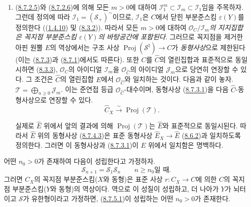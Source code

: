 \begin{remark}[8.7.4]
\begin{enumerate}
  \item[\rm{(ii)}] (\hyperref[II.8.7.2.5-ko]{8.7.2.5})와
  (\hyperref[II.8.7.2.6-ko]{8.7.2.6})에 의해 모든 $m>0$에 대하여
  $\mathcal{I}_1^m\subset\mathcal{I}_m\subset\mathcal{I}_1$임을 주목하자.
  그런데 정의에 따라 $\mathcal{I}_1=(\mathcal{S}_+)^{\sim}$이므로,
  $\mathcal{I}_1$은 $C$에서 닫힌 부분준스킴 $\varepsilon(Y)$를 정의한다
  ((\hyperref[II.1.4.10-ko]{1.4.10}) 및
  (\hyperref[II.8.3.2-ko]{8.3.2})). 따라서 모든 $m>0$에 대하여
  \emph{$\mathcal{O}_C/\mathcal{I}_m$의 지지집합은 꼭지점 부분준스킴
  $\varepsilon(Y)$의 바탕공간에 포함된다}. 그러므로 꼭지점을 제거한
  아핀 원뿔 $E$의 역상에서는 구조 사상
  $\operatorname{Proj}(\mathcal{S}^{\natural})\to C$가
  \emph{동형사상}으로 제한된다(이는
  (\hyperref[II.8.7.3-ko]{8.7.3})과
  (\hyperref[II.8.7.1-ko]{8.7.1})에서도 따른다). 또한 $C$를
  $\widehat{C}$의 열린집합과 표준적으로 동일시하면
  (\hyperref[II.8.3.3-ko]{8.3.3}), $\mathcal{O}_C$의 아이디얼
  $\mathcal{I}_m$을 $\mathcal{O}_{\widehat{C}}$의 아이디얼
  $\mathcal{J}_m$으로 당연히 연장할 수 있다. 그 조건은
  $\widehat{C}$의 열린집합 $\widehat{E}$에서
  $\mathcal{O}_{\widehat{C}}$와 일치하는 것이다. 다음과 같이 놓자.
  $\mathcal{T}=\bigoplus_{n\geqslant 0}\mathcal{J}_m$.
  이는 준연접 등급 $\mathcal{O}_{\widehat{C}}$-대수이며, 동형사상
  (\hyperref[II.8.7.3.1-ko]{8.7.3.1})을 다음
  $\widehat{C}$-동형사상으로 연장할 수 있다.
  \begin{equation}
  \label{II.8.7.4.3-ko}
    \widehat{C}_X\xrightarrow{\sim}\operatorname{Proj}(\mathcal{T}).
  \tag{8.7.4.3}
  \end{equation}

  실제로 $\widehat{E}$ 위에서 앞의 결과에 의해
  $\operatorname{Proj}(\mathcal{T})$는 $\widehat{E}$와 표준적으로
  동일시된다. 따라서 $\widehat{E}$ 위의 동형사상
  (\hyperref[II.8.7.4.3-ko]{8.7.4.3})은 표준 동형사상
  $\widehat{E}_X\to\widehat{E}$
  (\hyperref[II.8.6.2-ko]{8.6.2})과 일치하도록 정의한다. 그러면 이
  동형사상과 (\hyperref[II.8.7.3.1-ko]{8.7.3.1})이 $E$ 위에서
  일치함은 명백하다.
\end{enumerate}
\end{remark}

\begin{corollary}[8.7.5]
\label{II.8.7.5-ko}
어떤 $n_0>0$가 존재하여 다음이 성립한다고 가정하자.
\begin{equation}
\label{II.8.7.5.1-ko}
  \mathcal{S}_{n+1}=\mathcal{S}_1\mathcal{S}_n
  \qquad\text{$n\geqslant n_0$일 때}.
\tag{8.7.5.1}
\end{equation}
그러면 $C_X$의 꼭지점 부분준스킴($X$와 동형)은 표준 사상
$r:C_X\to C$에 의한 $C$의 꼭지점 부분준스킴($Y$와 동형)의 역상이다.
역으로 이 성질이 성립하고, 더 나아가 $Y$가 뇌터이고 $\mathcal{S}$가
유한형이라고 가정하면, (\hyperref[II.8.7.5.1-ko]{8.7.5.1})이 성립하는
어떤 $n_0>0$가 존재한다.
\end{corollary}

